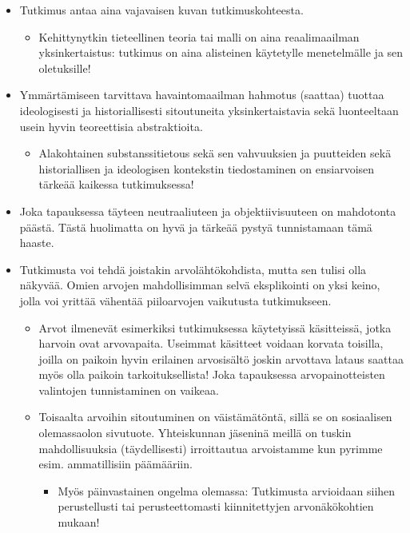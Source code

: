 \documentclass[
]{book}
\providecommand{\tightlist}{%
  \setlength{\itemsep}{0pt}\setlength{\parskip}{0pt}}
\begin{document}
\begin{itemize}
  \begin{itemize}
  \tightlist
  \item
    Tutkimus antaa aina vajavaisen kuvan tutkimuskohteesta.

    \begin{itemize}
    \tightlist
    \item
      Kehittynytkin tieteellinen teoria tai malli on aina reaalimaailman yksinkertaistus: tutkimus on aina alisteinen käytetylle menetelmälle ja sen oletuksille!
    \end{itemize}
  \item
    Ymmärtämiseen tarvittava havaintomaailman hahmotus (saattaa) tuottaa ideologisesti ja historiallisesti sitoutuneita yksinkertaistavia sekä luonteeltaan usein hyvin teoreettisia abstraktioita.

    \begin{itemize}
    \tightlist
    \item
      Alakohtainen substanssitietous sekä sen vahvuuksien ja puutteiden sekä historiallisen ja ideologisen kontekstin tiedostaminen on ensiarvoisen tärkeää kaikessa tutkimuksessa!
    \end{itemize}
  \item
    Joka tapauksessa täyteen neutraaliuteen ja objektiivisuuteen on mahdotonta päästä. Tästä huolimatta on hyvä ja tärkeää pystyä tunnistamaan tämä haaste.
  \item
    Tutkimusta voi tehdä joistakin arvolähtökohdista, mutta sen tulisi olla näkyvää. Omien arvojen mahdollisimman selvä eksplikointi on yksi keino, jolla voi yrittää vähentää piiloarvojen vaikutusta tutkimukseen.

    \begin{itemize}
    \tightlist
    \item
      Arvot ilmenevät esimerkiksi tutkimuksessa käytetyissä käsitteissä, jotka harvoin ovat arvovapaita. Useimmat käsitteet voidaan korvata toisilla, joilla on paikoin hyvin erilainen arvosisältö joskin arvottava lataus saattaa myös olla paikoin tarkoituksellista! Joka tapauksessa arvopainotteisten valintojen tunnistaminen on vaikeaa.
    \item
      Toisaalta arvoihin sitoutuminen on väistämätöntä, sillä se on sosiaalisen olemassaolon sivutuote. Yhteiskunnan jäseninä meillä on tuskin mahdollisuuksia (täydellisesti) irroittautua arvoistamme kun pyrimme esim. ammatillisiin päämääriin.

      \begin{itemize}
      \tightlist
      \item
        Myös päinvastainen ongelma olemassa: Tutkimusta arvioidaan siihen perustellusti tai perusteettomasti kiinnitettyjen arvonäkökohtien mukaan!
      \end{itemize}
    \end{itemize}
  \end{itemize}
\end{itemize}
\end{document}
